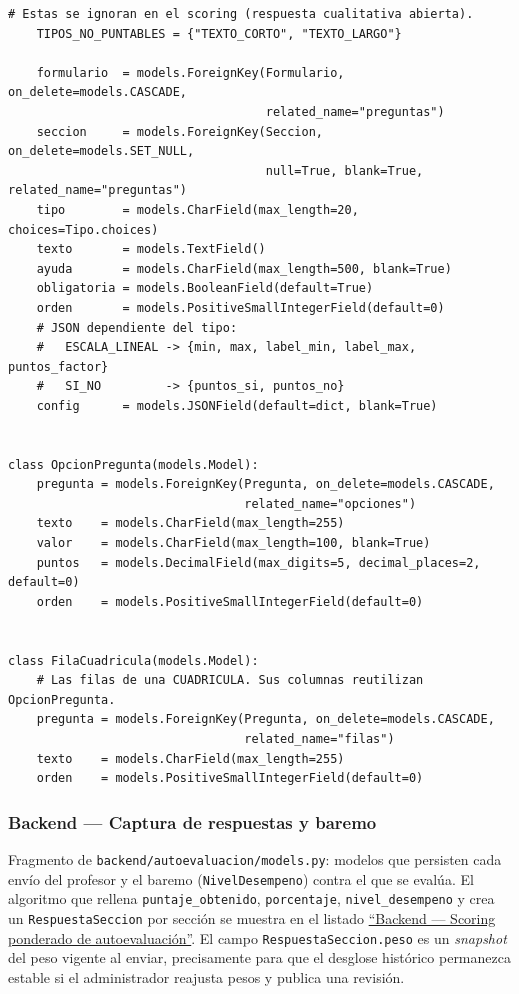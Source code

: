 \begin{lstlisting}[language={[3]Python}]
    # Estas se ignoran en el scoring (respuesta cualitativa abierta).
    TIPOS_NO_PUNTABLES = {"TEXTO_CORTO", "TEXTO_LARGO"}

    formulario  = models.ForeignKey(Formulario, on_delete=models.CASCADE,
                                    related_name="preguntas")
    seccion     = models.ForeignKey(Seccion, on_delete=models.SET_NULL,
                                    null=True, blank=True, related_name="preguntas")
    tipo        = models.CharField(max_length=20, choices=Tipo.choices)
    texto       = models.TextField()
    ayuda       = models.CharField(max_length=500, blank=True)
    obligatoria = models.BooleanField(default=True)
    orden       = models.PositiveSmallIntegerField(default=0)
    # JSON dependiente del tipo:
    #   ESCALA_LINEAL -> {min, max, label_min, label_max, puntos_factor}
    #   SI_NO         -> {puntos_si, puntos_no}
    config      = models.JSONField(default=dict, blank=True)


class OpcionPregunta(models.Model):
    pregunta = models.ForeignKey(Pregunta, on_delete=models.CASCADE,
                                 related_name="opciones")
    texto    = models.CharField(max_length=255)
    valor    = models.CharField(max_length=100, blank=True)
    puntos   = models.DecimalField(max_digits=5, decimal_places=2, default=0)
    orden    = models.PositiveSmallIntegerField(default=0)


class FilaCuadricula(models.Model):
    # Las filas de una CUADRICULA. Sus columnas reutilizan OpcionPregunta.
    pregunta = models.ForeignKey(Pregunta, on_delete=models.CASCADE,
                                 related_name="filas")
    texto    = models.CharField(max_length=255)
    orden    = models.PositiveSmallIntegerField(default=0)
\end{lstlisting}

\subsubsection{Backend --- Captura de respuestas y baremo}\label{lst:modelos_respuesta}

Fragmento de \texttt{backend/autoevaluacion/models.py}: modelos que persisten cada envío del profesor y el baremo (\texttt{NivelDesempeno}) contra el que se evalúa. El algoritmo que rellena \texttt{puntaje\_obtenido}, \texttt{porcentaje}, \texttt{nivel\_desempeno} y crea un \texttt{RespuestaSeccion} por sección se muestra en el listado \hyperref[lst:scoring]{``Backend --- Scoring ponderado de autoevaluación''}. El campo \texttt{RespuestaSeccion.peso} es un \emph{snapshot} del peso vigente al enviar, precisamente para que el desglose histórico permanezca estable si el administrador reajusta pesos y publica una revisión.

